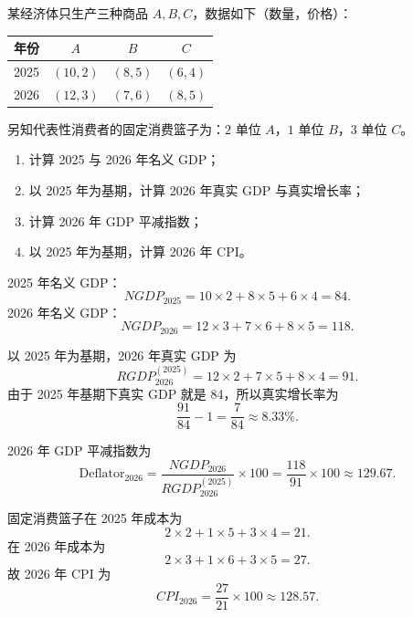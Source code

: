 \begin{question}
某经济体只生产三种商品 $A,B,C$，数据如下（数量，价格）：

\begin{center}
\begin{tabular}{c|ccc}
年份 & $A$ & $B$ & $C$\\ \hline
2025 & $(10,2)$ & $(8,5)$ & $(6,4)$\\
2026 & $(12,3)$ & $(7,6)$ & $(8,5)$
\end{tabular}
\end{center}

另知代表性消费者的固定消费篮子为：$2$ 单位 $A$，$1$ 单位 $B$，$3$ 单位 $C$。

\begin{enumerate}[label=(\arabic*),leftmargin=2.5em]
  \item 计算 2025 与 2026 年名义 GDP；
  \item 以 2025 年为基期，计算 2026 年真实 GDP 与真实增长率；
  \item 计算 2026 年 GDP 平减指数；
  \item 以 2025 年为基期，计算 2026 年 CPI。
\end{enumerate}

\begin{solution}
2025 年名义 GDP：
\[
NGDP_{2025}=10\times 2+8\times 5+6\times 4=84.
\]
2026 年名义 GDP：
\[
NGDP_{2026}=12\times 3+7\times 6+8\times 5=118.
\]

以 2025 年为基期，2026 年真实 GDP 为
\[
RGDP_{2026}^{(2025)}=12\times 2+7\times 5+8\times 4=91.
\]
由于 2025 年基期下真实 GDP 就是 84，所以真实增长率为
\[
\frac{91}{84}-1=\frac{7}{84}\approx 8.33\%.
\]

2026 年 GDP 平减指数为
\[
\text{Deflator}_{2026}=\frac{NGDP_{2026}}{RGDP_{2026}^{(2025)}}\times 100
=\frac{118}{91}\times 100\approx 129.67.
\]

固定消费篮子在 2025 年成本为
\[
2\times 2+1\times 5+3\times 4=21.
\]
在 2026 年成本为
\[
2\times 3+1\times 6+3\times 5=27.
\]
故 2026 年 CPI 为
\[
CPI_{2026}=\frac{27}{21}\times 100\approx 128.57.
\]

\end{solution}
\end{question}

